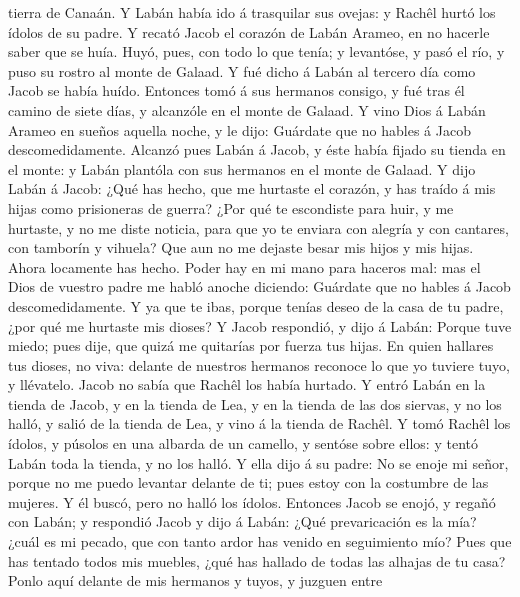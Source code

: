 tierra de Canaán.  Y Labán había ido á trasquilar sus
ovejas: y Rachêl hurtó los ídolos de su padre.  Y recató
Jacob el corazón de Labán Arameo, en no hacerle saber que se huía.
 Huyó, pues, con todo lo que tenía; y levantóse, y pasó el
río, y puso su rostro al monte de Galaad.  Y fué dicho á
Labán al tercero día como Jacob se había huído.  Entonces
tomó á sus hermanos consigo, y fué tras él camino de siete días, y
alcanzóle en el monte de Galaad.  Y vino Dios á Labán
Arameo en sueños aquella noche, y le dijo: Guárdate que no hables á
Jacob descomedidamente.  Alcanzó pues Labán á Jacob, y éste
había fijado su tienda en el monte: y Labán plantóla con sus hermanos en
el monte de Galaad.  Y dijo Labán á Jacob: ¿Qué has hecho,
que me hurtaste el corazón, y has traído á mis hijas como prisioneras de
guerra?  ¿Por qué te escondiste para huir, y me hurtaste, y
no me diste noticia, para que yo te enviara con alegría y con cantares,
con tamborín y vihuela?  Que aun no me dejaste besar mis
hijos y mis hijas. Ahora locamente has hecho.  Poder hay en
mi mano para haceros mal: mas el Dios de vuestro padre me habló anoche
diciendo: Guárdate que no hables á Jacob descomedidamente. 
Y ya que te ibas, porque tenías deseo de la casa de tu padre, ¿por qué
me hurtaste mis dioses?  Y Jacob respondió, y dijo á Labán:
Porque tuve miedo; pues dije, que quizá me quitarías por fuerza tus
hijas.  En quien hallares tus dioses, no viva: delante de
nuestros hermanos reconoce lo que yo tuviere tuyo, y llévatelo. Jacob no
sabía que Rachêl los había hurtado.  Y entró Labán en la
tienda de Jacob, y en la tienda de Lea, y en la tienda de las dos
siervas, y no los halló, y salió de la tienda de Lea, y vino á la tienda
de Rachêl.  Y tomó Rachêl los ídolos, y púsolos en una
albarda de un camello, y sentóse sobre ellos: y tentó Labán toda la
tienda, y no los halló.  Y ella dijo á su padre: No se
enoje mi señor, porque no me puedo levantar delante de ti; pues estoy
con la costumbre de las mujeres. Y él buscó, pero no halló los ídolos.
 Entonces Jacob se enojó, y regañó con Labán; y respondió
Jacob y dijo á Labán: ¿Qué prevaricación es la mía? ¿cuál es mi pecado,
que con tanto ardor has venido en seguimiento mío?  Pues
que has tentado todos mis muebles, ¿qué has hallado de todas las alhajas
de tu casa? Ponlo aquí delante de mis hermanos y tuyos, y juzguen entre
